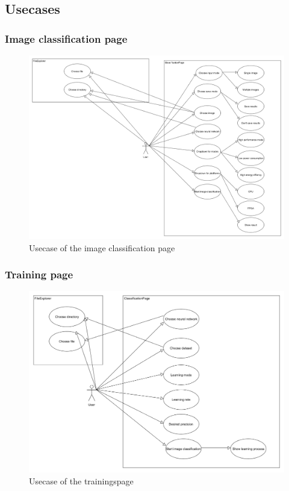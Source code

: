 \documentclass[parskip=full]{scrartcl}
\begin{document}
\subsection{Usecases}
\subsubsection{Image classification page}
\begin{figure}[htb!]
\centering
\includegraphics[width=\textwidth]{ClassificationUsecase}
\caption{Usecase of the image classification page}
\end{figure}
\subsubsection{Training page}
\begin{figure}[htb!]
\centering
\includegraphics[width=\textwidth]{TrainUsecase}
\caption{Usecase of the trainingspage}
\end{figure}
\clearpage
\end{document}
